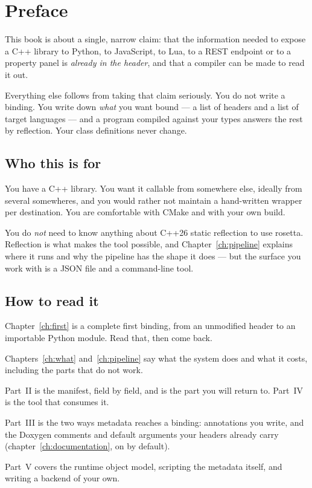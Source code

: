 \chapter*{Preface}

This book is about a single, narrow claim: that the information needed to
expose a C++ library to Python, to JavaScript, to Lua, to a REST endpoint or
to a property panel is \emph{already in the header}, and that a compiler can
be made to read it out.

Everything else follows from taking that claim seriously. You do not write a
binding. You write down \emph{what} you want bound --- a list of headers and a
list of target languages --- and a program compiled against your types answers
the rest by reflection. Your class definitions never change.

\section*{Who this is for}

You have a C++ library. You want it callable from somewhere else, ideally from
several somewheres, and you would rather not maintain a hand-written wrapper
per destination. You are comfortable with CMake and with your own build.

You do \emph{not} need to know anything about C++26 static reflection to use
rosetta. Reflection is what makes the tool possible, and Chapter~\ref{ch:pipeline}
explains where it runs and why the pipeline has the shape it does --- but the
surface you work with is a JSON file and a command-line tool.

\section*{How to read it}

\begin{description}[leftmargin=1.4cm,style=nextline,font=\normalfont\itshape]
  \item[In a hurry] Chapter~\ref{ch:first} is a complete first binding, from an
    unmodified header to an importable Python module. Read that, then come back.
  \item[Evaluating rosetta] Chapters~\ref{ch:what} and~\ref{ch:pipeline} say what
    the system does and what it costs, including the parts that do not work.
  \item[Using it in earnest] Part~II is the manifest, field by field, and is the
    part you will return to. Part~IV is the tool that consumes it.
  \item[Documenting what you bind] Part~III is the two ways metadata reaches a
    binding: annotations you write, and the Doxygen comments and default
    arguments your headers already carry
    (chapter~\ref{ch:documentation}, on by default).
  \item[Pushing past bindings] Part~V covers the runtime object model, scripting
    the metadata itself, and writing a backend of your own.
\end{description}

